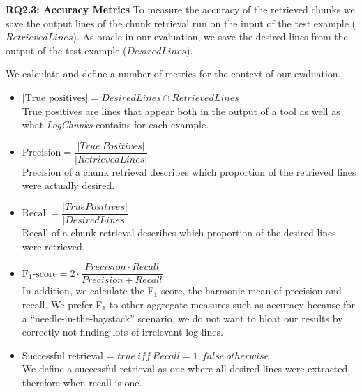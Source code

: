 \noindent
\textbf{RQ2.3: Accuracy Metrics}
To measure the accuracy of the retrieved chunks we save the output
lines of the chunk retrieval run on the input of the test example
($\mathit{RetrievedLines}$). As oracle in our evaluation, we save the
desired lines from the output of the test example
($\mathit{DesiredLines}$).

We calculate and define a number of metrics for the context of our
evaluation.

\vspace{0.2cm}
\begin{itemize}[leftmargin=0.4cm] \itemsep1em
	\item $|\mbox{True positives}| = \mathit{DesiredLines} \cap
	\mathit{RetrievedLines}$ \vspace{0.2cm}\\
        True positives are lines that appear both in the output of a
        tool as well as what \textit{LogChunks} contains for each
        example. 
	\item $\mbox{Precision} = \dfrac{|\mathit{True\
	Positives}|}{|\mathit{RetrievedLines}|}$ \vspace{0.21cm} \\
        Precision of a chunk retrieval describes which proportion of
        the retrieved lines were actually desired. 
	\item $\mbox{Recall} =
	\dfrac{|\mathit{TruePositives}|}{|\mathit{DesiredLines}|}$
	\vspace{0.2cm} \\
        Recall of a chunk retrieval describes which proportion of the
        desired lines were retrieved.
	\item $\mbox{F$_{1}$-score} = 2 \cdot \dfrac{\mathit{Precision}
	\cdot \mathit{Recall}}{\mathit{Precision} + \mathit{Recall}}$
	\vspace{0.2cm}\\
        In addition, we calculate the F$_{1}$-score, the harmonic mean
        of precision and recall. We prefer F$_{1}$ to other aggregate
        measures such as accuracy because for a
        ``needle-in-the-haystack'' scenario, we do not want to bloat
        our results by correctly not finding lots of irrelevant log
        lines.
	\item Successful retrieval = $\mathit{true}\ \mathit{iff}\
	\mathit{Recall} = 1, \mathit{false\ otherwise}$  \vspace{0.2cm} \\
	We define a successful retrieval as one where all desired lines were
	extracted, therefore when recall is one.
\end{itemize}

